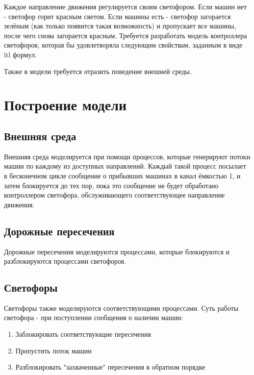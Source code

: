 \documentclass[a4papaer,12pt]{article}
\begin{document}
\newpage

Каждое направление движения регулируется своим светофором. Если машин нет - светофор горит красным
светом. Если машины есть - светофор загорается зелёным (как только появится такая возможность)
и пропускает все машины, после чего снова загорается красным.
Требуется разработать модель контроллера светофоров, которая бы удовлетворяла следующим свойствам,
заданным в виде ltl формул.

Также в модели требуется отразить поведение внешней среды.




\section{Построение модели}

\subsection{Внешняя среда}

Внешняя среда моделируется при помощи процессов, которые генерируют потоки машин по каждому
из доступных направлений. Каждый такой процесс посылает в бесконечном цикле сообщение о
прибывших машинах в канал ёмкостью 1, и затем блокируется до тех пор, пока это сообщение 
не будет обработано контроллером светофора, обслуживающего соответствующее направление 
движения.

\subsection{Дорожные пересечения}

Дорожные пересечения моделируются процессами, которые блокируются и разблокируются 
процессами светофоров.

\subsection{Светофоры}

Светофоры также моделируются соответствующими процессами. Суть работы светофора - при 
поступлении сообщения о наличии машин:

\begin{enumerate}
	\item Заблокировать соответствующие пересечения
	\item Пропустить поток машин
	\item Разблокировать "захваченные" пересечения в обратном порядке
\end{enumerate}
\end{document}
